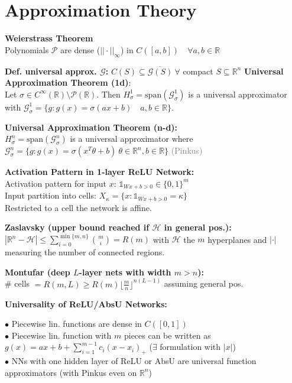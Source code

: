 \color{black}
\section*{Approximation Theory}
\textbf{Weierstrass Theorem}\\
Polynomials $\mathcal P$ are dense ($||\cdot||_\infty$) in $C([a,b])\quad \forall a,b\in\mathbb{R}$

\textbf{Def. universal approx. $\mathcal{G}$:} $C(S) \subseteq \overline{\mathcal{G}(S)}\  \forall$ compact 
$ S \subseteq \mathbb{R}^n$
\textbf{Universal Approximation Theorem (1d)}:\\
Let $\sigma \in C^{\infty}(\mathbb{R}) \setminus \mathcal{P}(\mathbb{R})$. Then $H_{\sigma}^1 = \text{span}(\mathcal{G}_{\sigma}^1)$ is a universal approximator with $\mathcal{G}_{\sigma}^1=\{g: g(x) = \sigma(ax + b)\quad a,b\in\mathbb{R}\}$.

\textbf{Universal Approximation Theorem (n-d):}\\
$H_{\sigma}^n =\text{span}(\mathcal{G}^n_\sigma)$ is a universal approximator where\\ $\mathcal{G}_{\sigma}^n=\{g: g(x)=\sigma(x^T \theta + b)\ \theta\!\in\!\mathbb{R}^n, b \!\in\! \mathbb{R}\}$ \textcolor{gray}{(Pinkus)}

\textbf{Activation Pattern in 1-layer ReLU Network:}\\
Activation pattern for input \(x\): \(\mathds{1}_{Wx+b>0} \in \{0,1\}^m \)\\
Input partition into cells: \(X_\kappa = \{x : \mathds{1}_{Wx+b>0} = \kappa\}\)\\
Restricted to a cell the network is affine.

\textbf{Zaslavsky (upper bound reached if \(\mathcal{H}\) in general pos.):}\\
$|\mathbb{R}^n - \mathcal{H}| \leq \sum_{i=0}^{\min \{m,n \}} {m \choose i} = R(m)$ with \(\mathcal{H}\) the \(m\) hyperplanes and $|\cdot|$ measuring the number of connected regions.

\textbf{Montufar (deep \(L\)-layer nets with width \(m > n\)):}\\
\# cells \(= R(m,L) \geq R(m) \lfloor \frac{m}{n} \rfloor^{n(L-1)}\) assuming general pos.

\textbf{Universality of ReLU/AbsU Networks:}

$\bullet$ Piecewise lin. functions are dense in $C([0,1])$\\
$\bullet$ Piecewise lin. function with $m$ pieces can be written as $g(x)=ax+b+\sum_{i=1}^{m-1}c_i(x-x_i)_+$ ($\exists$ formulation with $|x|$)\\
$\bullet$ NNs with one hidden layer of ReLU or AbsU are universal function approximators (with Pinkus even on $\mathbb R^n$)
